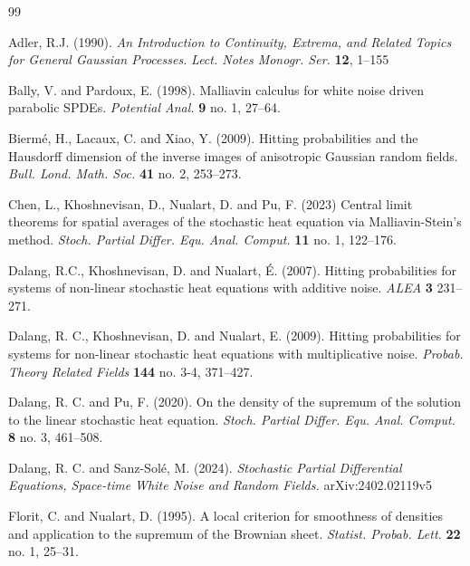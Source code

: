 \documentclass[12pt,a4paper]{article}
\newcommand{\<}{\langle}
\renewcommand{\>}{\rangle}
\begin{document}
 \begin{thebibliography}{99}
 
  Adler, R.J.  (1990). {\it An Introduction to Continuity, Extrema, and Related Topics for General Gaussian Processes.} \textit{Lect. Notes Monogr. Ser.} \textbf{12}, 1--155 

 
  Bally, V. and  Pardoux, E. (1998).
Malliavin calculus for white noise driven parabolic SPDEs.
{\it Potential Anal.} {\bf 9} no. 1, 27–64.
 
 Bierm\'e, H., Lacaux, C. and Xiao, Y. (2009).
Hitting probabilities and the Hausdorff dimension of the inverse images of anisotropic Gaussian random fields.
{\it Bull. Lond. Math. Soc.} {\bf 41}  no. 2, 253–273.
 
 Chen, L., Khoshnevisan, D.,  Nualart, D. and Pu, F. (2023)
Central limit theorems for spatial averages of the stochastic heat equation via Malliavin-Stein's method.
{\it Stoch. Partial Differ. Equ. Anal. Comput.} {\bf 11}  no. 1, 122–176.
 

 Dalang, R.C., Khoshnevisan, D. and Nualart, \'E. (2007). Hitting probabilities for systems of non-linear stochastic heat equations with additive noise. {\it ALEA} {\bf 3}  231--271.


Dalang, R. C., Khoshnevisan, D. and Nualart, E. (2009).
Hitting probabilities for systems for non-linear stochastic heat equations with multiplicative noise.
{\it Probab. Theory Related Fields}   {\bf144}  no. 3-4, 371–427.


Dalang, R. C. and  Pu, F. (2020).
On the density of the supremum of the solution to the linear stochastic heat equation.
{\it Stoch. Partial Differ. Equ. Anal. Comput.} {\bf 8}  no. 3, 461–508.



Dalang, R. C. and Sanz-Sol\'e, M. (2024). {\it Stochastic Partial Differential Equations, Space-time White Noise and Random Fields.} arXiv:2402.02119v5

Florit, C. and  Nualart, D. (1995).
A local criterion for smoothness of densities and application to the supremum of the Brownian sheet.
{\it Statist. Probab. Lett.}  {\bf 22} no. 1, 25–31.


\end{thebibliography}
\end{document}
